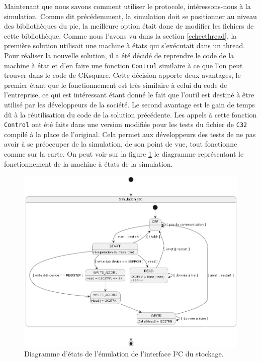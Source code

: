 \documentclass[a4paper]{article}
\begin{document}
Maintenant que nous savons comment utiliser le protocole, intéressons-nous à la
simulation. Comme dit précédemment, la simulation doit se positionner au niveau
des bibliothèques du \gls{pic}, la meilleure option était donc de modifier les
fichiers de cette bibliothèque. Comme nous l'avons vu dans la section
\ref{echecthread}, la première solution utilisait une machine à états qui
s'exécutait dans un thread. Pour réaliser la nouvelle solution, il a été décidé
de reprendre le code de la machine à état et d'en faire une fonction
\verb|Control| similaire à ce que l'on peut trouver dans le code de CKsquare.
Cette décision apporte deux avantages, le premier étant que le fonctionnement
est très similaire à celui du code de l'entreprise, ce qui est intéressant étant
donné le fait que l'outil est destiné à être utilisé par les développeurs de la
société. Le second avantage est le gain de temps dû à la réutilisation du code
de la solution précédente. Les appels à cette fonction \verb|Control| ont été
faits dans une version modifiée pour les tests du fichier de \verb|C32| compilé à
la place de l'original. Cela permet aux développeurs des tests de ne pas avoir à
se préoccuper de la simulation, de son point de vue, tout fonctionne comme sur
la carte. On peut voir sur la figure \ref{fig:machineetatsi2c} le diagramme
représentant le fonctionnement de la machine à états de la simulation.

\pagebreak
\begin{figure}[h!] \begin{center}
\includegraphics[scale=0.5]{./graphs/sm-i2c.png} \caption{Diagramme d'états de
l'émulation de l'interface I²C du stockage.} \label{fig:machineetatsi2c}
\end{center} \end{figure}
\end{document}
